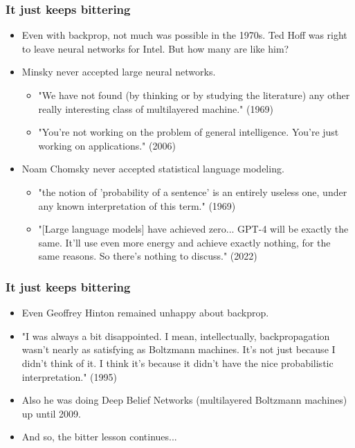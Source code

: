 \documentclass{beamer}
\begin{document}
\begin{frame}
    \frametitle{It just keeps bittering}

    \begin{itemize}
        \item Even with backprop, not much was possible in the 1970s. Ted Hoff was right to leave neural networks for Intel. But how many are like him?
        \item Minsky never accepted large neural networks.
        \begin{itemize}
            \item "We have not found (by thinking or by studying the literature) any other really interesting class of multilayered machine." (1969)
            \item "You're not working on the problem of general intelligence. You're just working on applications." (2006)
        \end{itemize}
        \item Noam Chomsky never accepted statistical language modeling.
        \begin{itemize}
            \item "the notion of 'probability of a sentence' is an entirely useless one, under any known interpretation of this term." (1969)
            \item "[Large language models] have achieved zero... GPT-4 will be exactly the same. It'll use even more energy and achieve exactly nothing, for the same reasons. So there's nothing to discuss." (2022)
        \end{itemize}
    \end{itemize}
\end{frame}

\begin{frame}
    \frametitle{It just keeps bittering}
    \begin{itemize}
        \item Even Geoffrey Hinton remained unhappy about backprop.
        \item "I was always a bit disappointed. I mean, intellectually, backpropagation wasn't nearly as satisfying as Boltzmann machines. It's not just because I didn't think of it. I think it's because it didn't have the nice probabilistic interpretation." (1995)
        \item Also he was doing Deep Belief Networks (multilayered Boltzmann machines) up until 2009.
        \item And so, the bitter lesson continues...
    \end{itemize}
\end{frame}
\end{document}
